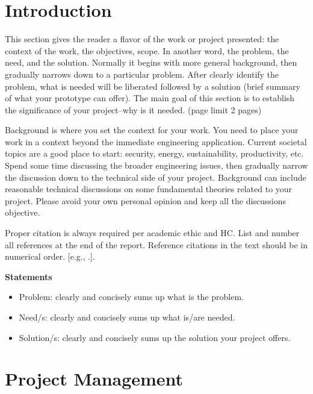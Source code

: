 \documentclass{engr1000j-s2} %
\begin{document}
  \section{Introduction}
  This section gives the reader a flavor of the work or project presented: the context
  of the work, the objectives, scope. In another word, the problem, the need, and
  the solution. Normally it begins with more general background, then gradually narrows
  down to a particular problem. After clearly identify the problem, what is needed
  will be liberated followed by a solution (brief summary of what your prototype
  can offer). The main goal of this section is to establish the significance of
  your project--why is it needed. (page limit 2 pages)

  Background is where you set the context for your work. You need to place your
  work in a context beyond the immediate engineering application. Current societal
  topics are a good place to start: security, energy, sustainability, productivity,
  etc. Spend some time discussing the broader engineering issues, then gradually
  narrow the discussion down to the technical side of your project. Background can
  include reasonable technical discussions on some fundamental theories related to
  your project. Please avoid your own personal opinion and keep all the
  discussions objective.

  Proper citation is always required per academic ethic and HC. List and number all
  references at the end of the report. Reference citations in the text should be
  in numerical order. [e.g., \citep{brandis2016nonequi}.].

  \hspace{1em}
  
  \textbf{Statements}
  \begin{itemize}
    \item Problem: clearly and concisely sums up what is the problem.\\

    \item Need/s: clearly and concisely sums up what is/are needed.\\

    \item Solution/s: clearly and concisely sums up the solution your project offers.
  \end{itemize}

  \hspace{1em}

  \section{Project Management}
\end{document}
